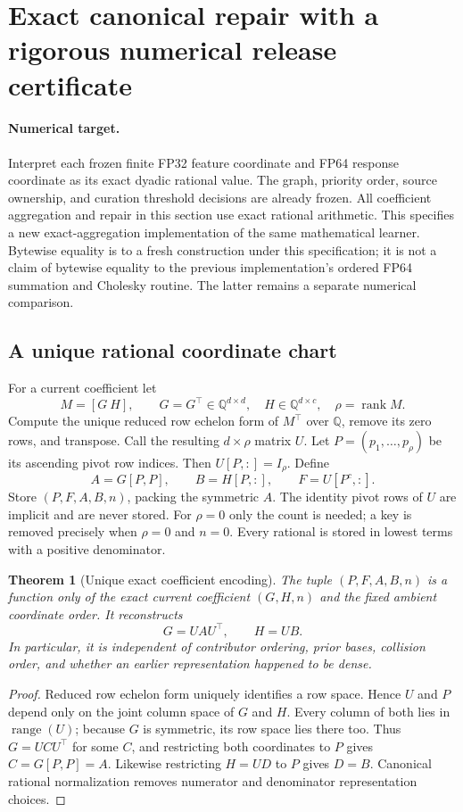 \documentclass[11pt,a4paper]{article}
\newtheorem{theorem}{Theorem}[section]
\begin{document}
\section{Exact canonical repair with a rigorous numerical release certificate}
\label{sec:exact-canonical-repair}

\paragraph{Numerical target.}
Interpret each frozen finite FP32 feature coordinate and FP64 response
coordinate as its exact dyadic rational value. The graph, priority order,
source ownership, and curation threshold decisions are already frozen.
All coefficient aggregation and repair in this section use exact rational
arithmetic. This specifies a new exact-aggregation implementation of the
same mathematical learner. Bytewise equality is to a fresh construction
under this specification; it is not a claim of bytewise equality to the
previous implementation's ordered FP64 summation and Cholesky routine.
The latter remains a separate numerical comparison.

\subsection{A unique rational coordinate chart}
For a current coefficient let
\[
 M=[G\ H],\qquad G=G^\top\in\mathbb Q^{d\times d},\quad
 H\in\mathbb Q^{d\times c},\quad \rho=\operatorname{rank}M.
\]
Compute the unique reduced row echelon form of $M^\top$ over
$\mathbb Q$, remove its zero rows, and transpose. Call the resulting
$d\times\rho$ matrix $U$. Let $P=(p_1,\ldots,p_\rho)$ be its ascending
pivot row indices. Then $U[P,:]=I_\rho$. Define
\[
 A=G[P,P],\qquad B=H[P,:],\qquad
 F=U[P^c,:].
\]
Store $(P,F,A,B,n)$, packing the symmetric $A$. The identity pivot rows
of $U$ are implicit and are never stored. For $\rho=0$ only the count is
needed; a key is removed precisely when $\rho=0$ and $n=0$.
Every rational is stored in lowest terms with a positive denominator.

\begin{theorem}[Unique exact coefficient encoding]
The tuple $(P,F,A,B,n)$ is a function only of the exact current coefficient
$(G,H,n)$ and the fixed ambient coordinate order. It reconstructs
\[
 G=UAU^\top,\qquad H=UB.
\]
In particular, it is independent of contributor ordering, prior bases,
collision order, and whether an earlier representation happened to be dense.
\end{theorem}
\begin{proof}
Reduced row echelon form uniquely identifies a row space. Hence $U$ and
$P$ depend only on the joint column space of $G$ and $H$. Every column of
both lies in $\operatorname{range}(U)$; because $G$ is symmetric, its row
space lies there too. Thus $G=UCU^\top$ for some $C$, and restricting both
coordinates to $P$ gives $C=G[P,P]=A$. Likewise restricting $H=UD$ to
$P$ gives $D=B$. Canonical rational normalization removes numerator and
denominator representation choices.
\end{proof}
\end{document}
